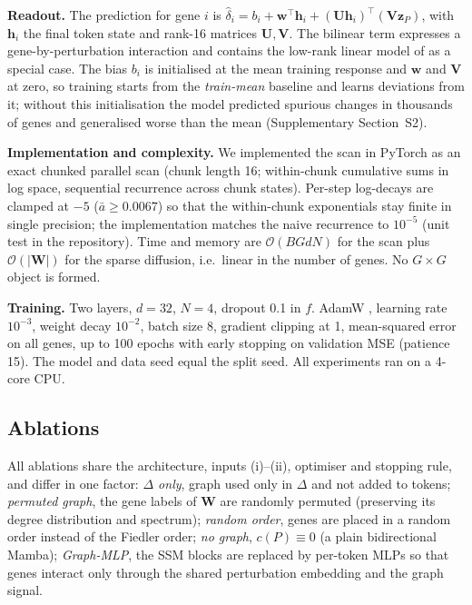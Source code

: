 \textbf{Readout.} The prediction for gene $i$ is
$\hat\delta_i=b_i+\mathbf{w}^{\top}\mathbf{h}_i+(\mathbf{U}\mathbf{h}_i)^{\top}(\mathbf{V}\mathbf{z}_P)$,
with $\mathbf{h}_i$ the final token state and rank-16 matrices $\mathbf{U},\mathbf{V}$.
The bilinear term expresses a gene-by-perturbation interaction and contains the
low-rank linear model of \citet{ahlmann2025} as a special case. The bias $b_i$ is
initialised at the mean training response and $\mathbf{w}$ and $\mathbf{V}$ at zero,
so training starts from the \emph{train-mean} baseline and learns deviations from
it; without this initialisation the model predicted spurious changes in thousands
of genes and generalised worse than the mean (Supplementary Section~S2).

\textbf{Implementation and complexity.} We implemented the scan in PyTorch as an
exact chunked parallel scan (chunk length 16; within-chunk cumulative sums in
log space, sequential recurrence across chunk states). Per-step log-decays are
clamped at $-5$ ($\bar a\geq 0.0067$) so that the within-chunk exponentials stay
finite in single precision; the implementation matches the naive recurrence to
$10^{-5}$ (unit test in the repository). Time and memory are
$\mathcal{O}(BGdN)$ for the scan plus $\mathcal{O}(|\mathbf{W}|)$ for the sparse
diffusion, i.e.\ linear in the number of genes. No $G\times G$ object is formed.

\textbf{Training.} Two layers, $d=32$, $N=4$, dropout 0.1 in $f$. AdamW
\citep{loshchilov2019}, learning rate $10^{-3}$, weight decay $10^{-2}$,
batch size 8, gradient clipping at 1, mean-squared error on all genes, up to 100
epochs with early stopping on validation MSE (patience 15). The model and data
seed equal the split seed. All experiments ran on a 4-core CPU.

\subsection{Ablations}
All ablations share the architecture, inputs (i)--(ii), optimiser and stopping
rule, and differ in one factor: \emph{$\Delta$ only}, graph used only in
$\Delta$ and not added to tokens; \emph{permuted graph}, the gene labels of
$\mathbf{W}$ are randomly permuted (preserving its degree distribution and
spectrum); \emph{random order}, genes are placed in a random order instead of the
Fiedler order; \emph{no graph}, $c(P)\equiv0$ (a plain bidirectional Mamba);
\emph{Graph-MLP}, the SSM blocks are replaced by per-token MLPs so that genes
interact only through the shared perturbation embedding and the graph signal.

